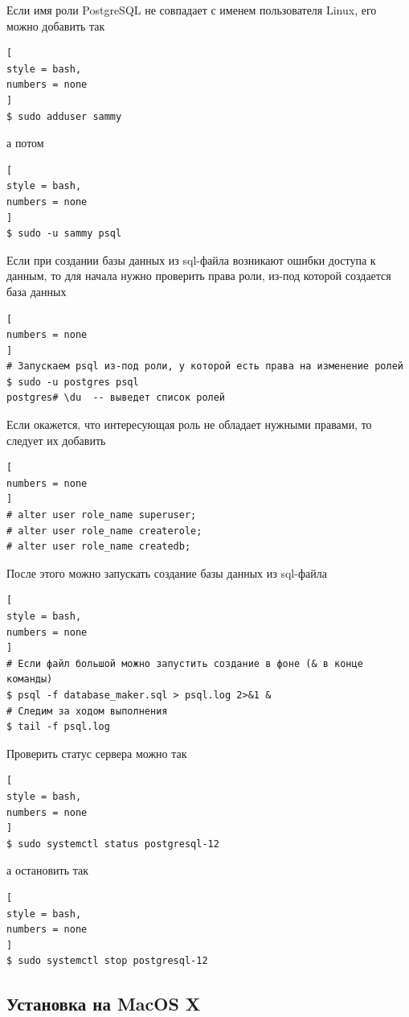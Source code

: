 \documentclass[%
	11pt,
	a4paper,
	utf8,
		]{article}
\begin{document}
Если имя роли PostgreSQL не совпадает с именем пользователя Linux, его можно добавить так
\begin{lstlisting}[
style = bash,
numbers = none
]
$ sudo adduser sammy
\end{lstlisting}
а потом
\begin{lstlisting}[
style = bash,
numbers = none	
]
$ sudo -u sammy psql
\end{lstlisting}

Если при создании базы данных из sql-файла возникают ошибки доступа к данным, то для начала нужно проверить права роли, из-под которой создается база данных
\begin{lstlisting}[
numbers = none
]
# Запускаем psql из-под роли, у которой есть права на изменение ролей
$ sudo -u postgres psql
postgres# \du  -- выведет список ролей
\end{lstlisting}

Если окажется, что интересующая роль не обладает нужными правами, то следует их добавить
\begin{lstlisting}[
numbers = none	
]
# alter user role_name superuser;
# alter user role_name createrole;
# alter user role_name createdb;
\end{lstlisting}

После этого можно запускать создание базы данных из sql-файла
\begin{lstlisting}[
style = bash,
numbers = none	
]
# Если файл большой можно запустить создание в фоне (& в конце команды)
$ psql -f database_maker.sql > psql.log 2>&1 &
# Следим за ходом выполнения
$ tail -f psql.log
\end{lstlisting}

Проверить статус сервера можно так
\begin{lstlisting}[
style = bash,
numbers = none
]
$ sudo systemctl status postgresql-12
\end{lstlisting}
а остановить так
\begin{lstlisting}[
style = bash,
numbers = none
]
$ sudo systemctl stop postgresql-12
\end{lstlisting}



\subsection{Установка на MacOS X}
\end{document}
